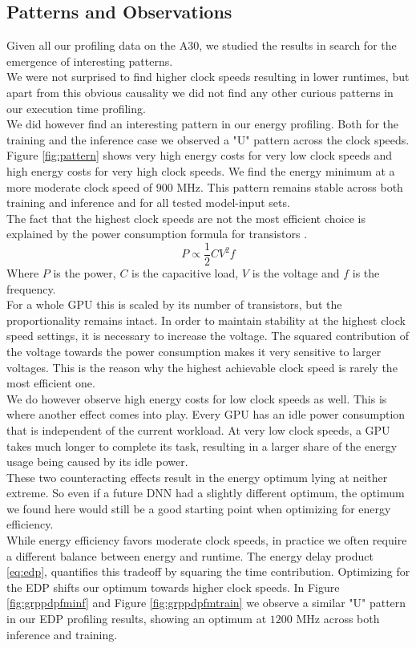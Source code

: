 \subsection{Patterns and Observations}
Given all our profiling data on the A30, we studied the results in search for the emergence of interesting patterns. \\
We were not surprised to find higher clock speeds resulting in lower runtimes, but apart from this obvious causality we did not find any other curious patterns in our execution time profiling. \\
We did however find an interesting pattern in our energy profiling. Both for the training and the inference case we observed a "U" pattern across the clock speeds. Figure \ref{fig:pattern} shows very high energy costs for very low clock speeds and high energy costs for very high clock speeds. We find the energy minimum at a more moderate clock speed of $900$ MHz. This pattern remains stable across both training and inference and for all tested model-input sets. \\
The fact that the highest clock speeds are not the most efficient choice is explained by the power consumption formula for transistors \cite{hennessy2017computer}. 
\begin{equation}
    P \propto \frac{1}{2} C V^2 f
\end{equation}
Where $P$ is the power, $C$ is the capacitive load, $V$ is the voltage and $f$ is the frequency. \\
For a whole GPU this is scaled by its number of transistors, but the proportionality remains intact. In order to maintain stability at the highest clock speed settings, it is necessary to increase the voltage. The squared contribution of the voltage towards the power consumption makes it very sensitive to larger voltages. This is the reason why the highest achievable clock speed is rarely the most efficient one. \\
We do however observe high energy costs for low clock speeds as well. This is where another effect comes into play. Every GPU has an idle power consumption that is independent of the current workload. At very low clock speeds, a GPU takes much longer to complete its task, resulting in a larger share of the energy usage being caused by its idle power. \\
These two counteracting effects result in the energy optimum lying at neither extreme. So even if a future DNN had a slightly different optimum, the optimum we found here would still be a good starting point when optimizing for energy efficiency.\\
While energy efficiency favors moderate clock speeds, in practice we often require a different balance between energy and runtime. The energy delay product \ref{eq:edp}, quantifies this tradeoff by squaring the time contribution. Optimizing for the EDP shifts our optimum towards higher clock speeds. In Figure \ref{fig:grppdpfminf} and Figure \ref{fig:grppdpfmtrain} we observe a similar "U" pattern in our EDP profiling results, showing an optimum at $1200$ MHz across both inference and training.


